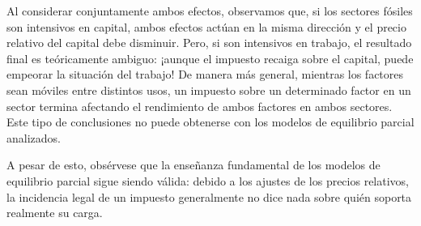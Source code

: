 \documentclass[10pt,a4paper]{article}
\begin{document}
Al considerar conjuntamente ambos efectos, observamos que, si los sectores fósiles son intensivos en capital, ambos efectos actúan en la misma dirección y el precio relativo del capital debe disminuir. Pero, si son intensivos en trabajo, el resultado final es teóricamente ambiguo: ¡aunque el impuesto recaiga sobre el capital, puede empeorar la situación del trabajo! De manera más general, mientras los factores sean móviles entre distintos usos, un impuesto sobre un determinado factor en un sector termina afectando el rendimiento de ambos factores en ambos sectores. Este tipo de conclusiones no puede obtenerse con los modelos de equilibrio parcial analizados.

A pesar de esto, obsérvese que la enseñanza fundamental de los modelos de equilibrio parcial sigue siendo válida: debido a los ajustes de los precios relativos, la incidencia legal de un impuesto generalmente no dice nada sobre quién soporta realmente su carga.
\end{document}

